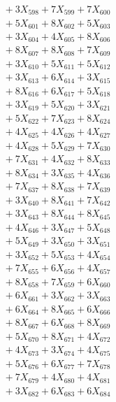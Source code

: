 \documentclass[a4paper,10pt]{article}
\begin{document}
{\begin{align}
&\;  + 3 X_{598} + 7 X_{599} + 7 X_{600} \\[0.3ex]
&\;  + 5 X_{601} + 8 X_{602} + 5 X_{603} \\[0.3ex]
&\;  + 3 X_{604} + 4 X_{605} + 8 X_{606} \\[0.3ex]
&\;  + 8 X_{607} + 8 X_{608} + 7 X_{609} \\[0.5ex]\allowbreak
&\;  + 3 X_{610} + 5 X_{611} + 5 X_{612} \\[0.3ex]
&\;  + 3 X_{613} + 6 X_{614} + 3 X_{615} \\[0.3ex]
&\;  + 8 X_{616} + 6 X_{617} + 5 X_{618} \\[0.3ex]
&\;  + 3 X_{619} + 5 X_{620} + 3 X_{621} \\[0.3ex]
&\;  + 5 X_{622} + 7 X_{623} + 8 X_{624} \\[0.3ex]
&\;  + 4 X_{625} + 4 X_{626} + 4 X_{627} \\[0.3ex]
&\;  + 4 X_{628} + 5 X_{629} + 7 X_{630} \\[0.3ex]
&\;  + 7 X_{631} + 4 X_{632} + 8 X_{633} \\[0.3ex]
&\;  + 8 X_{634} + 3 X_{635} + 4 X_{636} \\[0.3ex]
&\;  + 7 X_{637} + 8 X_{638} + 7 X_{639} \\[0.5ex]\allowbreak
&\;  + 3 X_{640} + 8 X_{641} + 7 X_{642} \\[0.3ex]
&\;  + 3 X_{643} + 8 X_{644} + 8 X_{645} \\[0.3ex]
&\;  + 4 X_{646} + 3 X_{647} + 5 X_{648} \\[0.3ex]
&\;  + 5 X_{649} + 3 X_{650} + 3 X_{651} \\[0.3ex]
&\;  + 3 X_{652} + 5 X_{653} + 4 X_{654} \\[0.3ex]
&\;  + 7 X_{655} + 6 X_{656} + 4 X_{657} \\[0.3ex]
&\;  + 8 X_{658} + 7 X_{659} + 6 X_{660} \\[0.3ex]
&\;  + 6 X_{661} + 3 X_{662} + 3 X_{663} \\[0.3ex]
&\;  + 6 X_{664} + 8 X_{665} + 6 X_{666} \\[0.3ex]
&\;  + 8 X_{667} + 6 X_{668} + 8 X_{669} \\[0.5ex]\allowbreak
&\;  + 5 X_{670} + 8 X_{671} + 4 X_{672} \\[0.3ex]
&\;  + 4 X_{673} + 3 X_{674} + 4 X_{675} \\[0.3ex]
&\;  + 5 X_{676} + 6 X_{677} + 7 X_{678} \\[0.3ex]
&\;  + 7 X_{679} + 4 X_{680} + 4 X_{681} \\[0.3ex]
&\;  + 3 X_{682} + 6 X_{683} + 6 X_{684} \\[0.3ex]

\end{align}}
\end{document}
